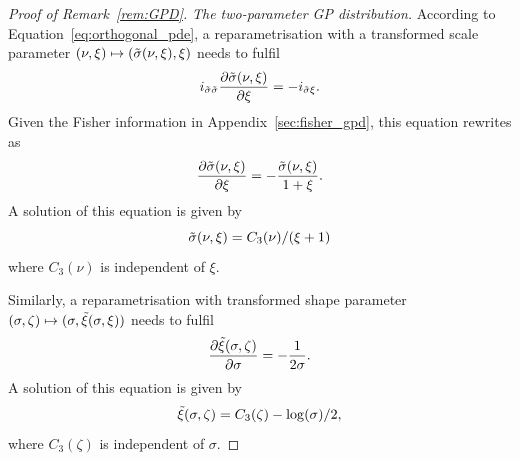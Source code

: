 \documentclass{article}
\newcommand{\1}{\mathds{1}}
\theoremstyle{definition}
\begin{document}
\begin{proof}[Proof of Remark~\ref{rem:GPD}]

\textit{The two-parameter GP distribution.} According to Equation~\eqref{eq:orthogonal_pde}, a reparametrisation with a transformed scale parameter $(\nu,\xi)\mapsto(\Tilde{\sigma}(\nu,\xi),\xi)$ needs to fulfil
\begin{equation*}
i_{\Tilde\sigma\Tilde\sigma}\frac{\partial\Tilde\sigma(\nu,\xi)}{\partial \xi} = -i_{\Tilde\sigma\xi}.
\end{equation*}
Given the Fisher information in Appendix~\ref{sec:fisher_gpd}, this equation rewrites as
\begin{equation*}
\frac{\partial\Tilde\sigma(\nu,\xi)}{\partial \xi} = -\frac{\Tilde\sigma(\nu,\xi)}{1+\xi}.
\end{equation*}
A solution of this equation is given by
\begin{equation*}
    \Tilde{\sigma}(\nu,\xi) = C_3(\nu)/(\xi+1)
\end{equation*}
where $C_3(\nu)$ is independent of $\xi$.

Similarly, a reparametrisation with transformed shape parameter $(\sigma,\zeta)\mapsto(\sigma,\Tilde{\xi}(\sigma,\xi))$ needs to fulfil
\begin{equation*}
    \frac{\partial\Tilde\xi(\sigma,\zeta)}{\partial \sigma} = -\frac{1}{2\sigma}.
\end{equation*}
A solution of this equation is given by
\begin{equation*}
    \Tilde\xi(\sigma,\zeta) = C_3(\zeta)-\log(\sigma)/2,
\end{equation*}
where $C_3(\zeta)$ is independent of $\sigma$.


\end{proof}
\end{document}
